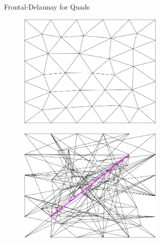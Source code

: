 \begin{figure}[p]
\begin{subfigure}[b]{\textwidth}
\begin{subfigure}[b]{0.32\textwidth}
        \end{subfigure}
        \caption{Frontal-Delaunay for Quads}
        \label{fig:Gmsh-Frontal-Quads}
    \end{subfigure}
    \begin{subfigure}[b]{\textwidth}
        \centering
        \begin{subfigure}[b]{0.32\textwidth}
            \centering
            \includegraphics[width=\textwidth]{report/Images/Software/Gmsh meshing algorithms/gmsh_meshing_algorithms_bamg.png}
        \end{subfigure}
        \begin{subfigure}[b]{0.32\textwidth}
            \centering
            \includegraphics[width=\textwidth]{report/Images/Software/Gmsh meshing algorithms/gmsh_meshing_algorithms_embedded_bamg.png}

\end{subfigure}
\end{subfigure}
\end{figure}
